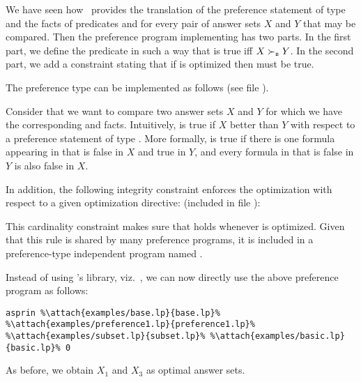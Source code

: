 We have seen how \asprin\ provides the translation of the preference statement  of type  
and the facts of predicates  and  
for every pair of answer sets $X$ and $Y$ that may be compared.
Then the preference program implementing  has two parts.
In the first part, we define the predicate  
in such a way that  is true 
iff $X \succ_{\texttt{s}} Y$.
In the second part, we add a constraint stating that 
if  is optimized then  must be true. 

\begin{example}
The preference type  can be implemented as follows
(see file ).
%

%
Consider that we want to compare two answer sets $X$ and $Y$
for which we have the corresponding  and  facts. 
Intuitively,  is true if $X$ better than $Y$ with respect to a preference statement  
of type . 
More formally, 
 is true if there is one formula  appearing in  that is false in $X$ and true in $Y$, 
and every formula  in  that is false in $Y$ is also false in $X$.  

In addition, 
the following integrity constraint enforces the optimization with respect to a given optimization directive:
(included in file ):
%

%
This cardinality constraint makes sure that  holds whenever  is optimized. 
Given that this rule is shared by many preference programs, 
it is included in a preference-type independent program named .

Instead of using \asprin's library, viz.~, 
we can now directly use the above preference program as follows:
\begin{lstlisting}[numbers=none,escapechar=\%]
asprin %\attach{examples/base.lp}{base.lp}% %\attach{examples/preference1.lp}{preference1.lp}% %\attach{examples/subset.lp}{subset.lp}% %\attach{examples/basic.lp}{basic.lp}% 0
\end{lstlisting}
As before, we obtain $X_1$ and $X_3$ as optimal answer sets.
\end{example}

